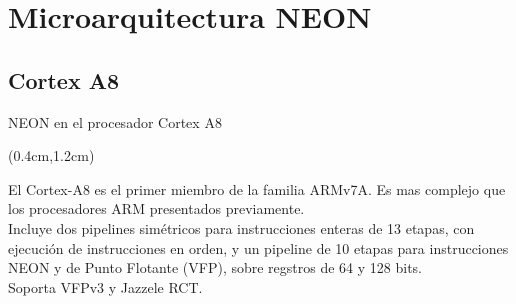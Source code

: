 \section{Microarquitectura NEON}

\subsection{Cortex A8}
\begin{frame}{NEON en el procesador Cortex A8}
 \begin{textblock*}{\textwidth}(0.4cm,1.2cm)
  \begin{tcolorbox}[enhanced jigsaw,rounded corners, drop fuzzy shadow=ShadowColor]
   El Cortex-A8 es el primer miembro de la familia ARMv7A. Es mas complejo que los procesadores ARM presentados previamente.\\
   Incluye dos pipelines simétricos para instrucciones enteras de 13 etapas, con ejecución de instrucciones en orden, y un pipeline de 10 etapas para instrucciones NEON y de Punto Flotante (VFP), sobre regstros de 64 y 128 bits.\\
   Soporta VFPv3 y Jazzele RCT.
  \end{tcolorbox}
 \end{textblock*}
\end{frame}
%
%
